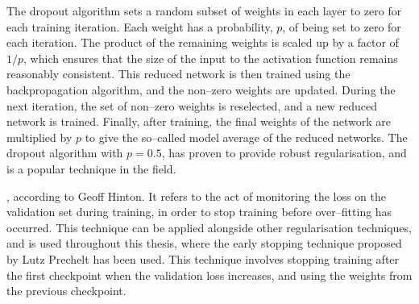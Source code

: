 The dropout algorithm sets a random subset of weights in each layer to zero for
each training iteration. Each weight has a probability, $p$, of being set to 
zero for each iteration. The product of the remaining weights is scaled up by 
a factor of $1/p$, which ensures that the size of the input to the activation 
function remains reasonably consistent. This reduced network is then trained 
using the backpropagation algorithm, and the non--zero weights are updated. 
During the next iteration, the set of non--zero weights is reselected, and a 
new reduced network is trained. Finally, after training, the final weights of 
the network are multiplied by $p$ to give the so--called model average of the 
reduced networks. The dropout algorithm with $p=0.5$, has proven to provide 
robust regularisation, and is a popular technique in the field\cite{Lecun2015}.

, according to Geoff
Hinton\cite{Hinton2015}. It refers to the act of monitoring the loss on the 
validation set during training, in order to stop training before over--fitting 
has occurred. This technique can be applied alongside other regularisation 
techniques, and is used throughout this thesis, where the early stopping 
technique proposed by Lutz Prechelt\cite{OrrGenevieveB.1998NNTo} has been used.
This technique involves stopping training after the first checkpoint when the 
validation loss increases, and using the weights from the previous checkpoint. 
